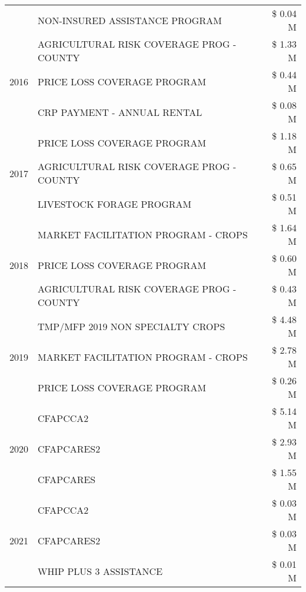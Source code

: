 \begin{tabular}{llr}
 & NON-INSURED ASSISTANCE PROGRAM & \$ 0.04 M \\
\cline{1-3}
\multirow[t]{3}{*}{2016} & AGRICULTURAL RISK COVERAGE PROG - COUNTY & \$ 1.33 M \\
 & PRICE LOSS COVERAGE PROGRAM & \$ 0.44 M \\
 & CRP PAYMENT - ANNUAL RENTAL & \$ 0.08 M \\
\cline{1-3}
\multirow[t]{3}{*}{2017} & PRICE LOSS COVERAGE PROGRAM & \$ 1.18 M \\
 & AGRICULTURAL RISK COVERAGE PROG - COUNTY & \$ 0.65 M \\
 & LIVESTOCK FORAGE PROGRAM & \$ 0.51 M \\
\cline{1-3}
\multirow[t]{3}{*}{2018} & MARKET FACILITATION PROGRAM - CROPS & \$ 1.64 M \\
 & PRICE LOSS COVERAGE PROGRAM & \$ 0.60 M \\
 & AGRICULTURAL RISK COVERAGE PROG - COUNTY & \$ 0.43 M \\
\cline{1-3}
\multirow[t]{3}{*}{2019} & TMP/MFP 2019 NON SPECIALTY CROPS & \$ 4.48 M \\
 & MARKET FACILITATION PROGRAM - CROPS & \$ 2.78 M \\
 & PRICE LOSS COVERAGE PROGRAM & \$ 0.26 M \\
\cline{1-3}
\multirow[t]{3}{*}{2020} & CFAPCCA2 & \$ 5.14 M \\
 & CFAPCARES2 & \$ 2.93 M \\
 & CFAPCARES & \$ 1.55 M \\
\cline{1-3}
\multirow[t]{3}{*}{2021} & CFAPCCA2 & \$ 0.03 M \\
 & CFAPCARES2 & \$ 0.03 M \\
 & WHIP PLUS 3 ASSISTANCE & \$ 0.01 M \\
\cline{1-3}
\bottomrule
\end{tabular}
